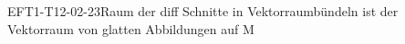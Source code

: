 
\begin{REM}{EFT1-T12-02-23}{Raum der diff Schnitte in Vektorraumbündeln ist der Vektorraum von glatten Abbildungen auf M}
\end{REM}
